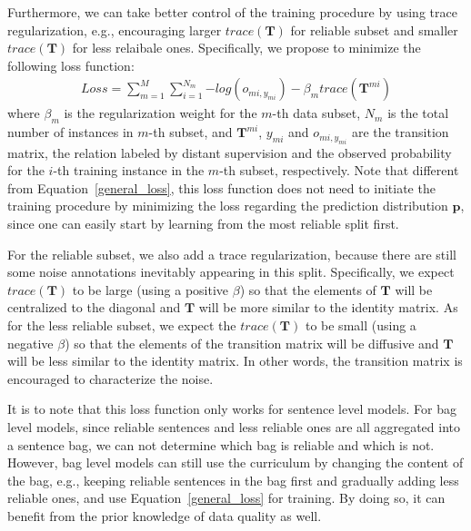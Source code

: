 Furthermore, we can take better control of the training procedure by using trace regularization, e.g., encouraging larger $trace (\mathbf{T})$ for reliable subset and smaller $trace (\mathbf{T})$ for less relaibale ones.
Specifically, we propose to minimize the following  loss function:
%
\begin{equation}
\begin{aligned}
Loss=\sum_{m=1}^M{\sum_{i=1}^{N_m}{-log(o_{mi,y_{mi}})}} - \beta_m trace(\mathbf{T}^{mi})
\end{aligned}
\end{equation}
where $\beta_m$ is the regularization weight for the $m$-th data subset, $N_m$ is the total number of instances in $m$-th subset, and  $\mathbf{T}^{mi}$, $y_{mi}$ and $o_{mi,y_{mi}}$ are the transition matrix, the relation labeled by distant supervision and the observed probability for the $i$-th training instance in the $m$-th subset, respectively. Note that different from Equation~\ref{general_loss}, this loss function does not need to initiate the training procedure by
minimizing the loss regarding the prediction distribution $\mathbf{p}$, since one can easily start by learning from the most reliable split first. 


For the reliable subset, we also add a trace regularization, because there are still some noise annotations inevitably appearing in this split. 
Specifically, we expect $trace(\mathbf{T})$ to be large (using a positive $\beta$) so that the elements of $\mathbf{T}$ will be centralized to the diagonal and $\mathbf{T}$ will be more similar to the identity matrix. As for the  less reliable subset, we expect the $trace (\mathbf{T})$ to be small (using a negative $\beta$) so that the elements of the transition matrix will be diffusive and $\mathbf{T}$  will be less similar to the identity matrix. In other words, the transition matrix is encouraged to characterize the noise.

It is to note that this loss function only works for sentence level models. For bag level models, since reliable sentences and less reliable ones are all aggregated into a sentence bag,  we can not determine which bag is reliable and which is not. However, bag level models can still use the curriculum by changing the content of the bag, e.g., keeping reliable sentences in the bag first and gradually adding less reliable ones, and use Equation~\ref{general_loss} for training. By doing so, it can benefit from the prior knowledge of data quality as well.



